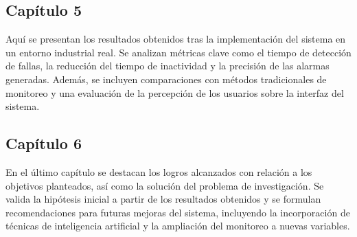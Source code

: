 \subsection{Capítulo 5}
Aquí se presentan los resultados obtenidos tras la implementación del sistema en un entorno industrial real. Se analizan métricas clave como el tiempo de detección de fallas, la reducción del tiempo de inactividad y la precisión de las alarmas generadas. Además, se incluyen comparaciones con métodos tradicionales de monitoreo y una evaluación de la percepción de los usuarios sobre la interfaz del sistema.
\subsection{Capítulo 6}
En el último capítulo se destacan los logros alcanzados con relación a los objetivos planteados, así como la solución del problema de investigación. Se valida la hipótesis inicial a partir de los resultados obtenidos y se formulan recomendaciones para futuras mejoras del sistema, incluyendo la incorporación de técnicas de inteligencia artificial y la ampliación del monitoreo a nuevas variables.


